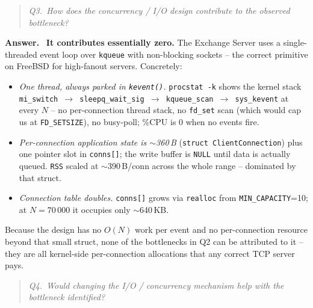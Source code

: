 \documentclass[11pt,a4paper]{article}
\newcommand{\qbox}[1]{%
  \begin{quote}\itshape #1\end{quote}%
}
\newenvironment{answer}
  {\begin{answerbox}\textbf{\color{accent}Answer.}\ }
  {\end{answerbox}}
\begin{document}
\qbox{Q3.\ How does the concurrency / I/O design contribute to the observed
bottleneck?}

\begin{answer}
\textbf{It contributes essentially zero.}  The Exchange Server uses a
single-threaded event loop over \texttt{kqueue} with non-blocking sockets --
the correct primitive on FreeBSD for high-fanout servers.  Concretely:
\begin{itemize}[leftmargin=1.5em,itemsep=0.15em]
  \item \emph{One thread, always parked in \texttt{kevent()}.}
        \texttt{procstat -k} shows the kernel stack
        \texttt{mi\_switch $\to$ sleepq\_wait\_sig $\to$ kqueue\_scan $\to$
        sys\_kevent} at every $N$ -- no per-connection thread stack, no
        \texttt{fd\_set} scan (which would cap us at \texttt{FD\_SETSIZE}),
        no busy-poll; \%CPU is 0 when no events fire.
  \item \emph{Per-connection application state is $\sim$360\,B}
        (\texttt{struct ClientConnection}) plus one pointer slot in
        \texttt{conns[]}; the write buffer is \texttt{NULL} until data is
        actually queued.  \texttt{RSS} scaled at $\sim$390\,B/conn across
        the whole range -- dominated by that struct.
  \item \emph{Connection table doubles.}  \texttt{conns[]} grows via
        \texttt{realloc} from \texttt{MIN\_CAPACITY}=10; at $N=70\,000$ it
        occupies only $\sim$640\,KB.
\end{itemize}
Because the design has no $O(N)$ work per event and no per-connection
resource beyond that small struct, none of the bottlenecks in Q2 can be
attributed to it -- they are all kernel-side per-connection allocations
that any correct TCP server pays.
\end{answer}

\qbox{Q4.\ Would changing the I/O / concurrency mechanism help with the
bottleneck identified?}
\end{document}
